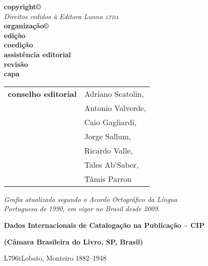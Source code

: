 \newcommand{\linha}[2]{\ifdef{#2}{\linhalayout{#1}{#2}}{}}

\begingroup\tiny
\parindent=0cm
\thispagestyle{empty}

\textbf{copyright©}\\
\mbox{}\qquad\qquad\quad\hspace{4pt} \textit{Direitos cedidos à Editora Lunna \textsc{ltda}}\\
\textbf{organização©}\\

\textbf{edição}\\
\textbf{coedição}\\
\textbf{assistência editorial}\\
\textbf{revisão}\\
\textbf{capa}\\

\hspace{-5pt}\begin{tabular}{ll}
\textbf{conselho editorial} & Adriano Scatolin,  \\
							& Antonio Valverde,  \\
							& Caio Gagliardi,    \\
							& Jorge Sallum,      \\
							& Ricardo Valle,     \\
							& Tales Ab'Saber,    \\
							& Tâmis Parron      
\end{tabular}

\bigskip
 
\textit{Grafia atualizada segundo o Acordo Ortográfico da Língua\\
Portuguesa de 1990, em vigor no Brasil desde 2009.}\\

\bigskip

\noindent\textbf{Dados Internacionais de Catalogação na Publicação -- CIP}

\noindent\textbf{(Câmara Brasileira do Livro, SP, Brasil)}

\hrulefill

L796t\hspace{5pt}Lobato, Monteiro 1882--1948

